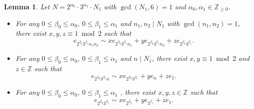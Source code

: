 \documentclass[12pt]{amsart}
\numberwithin{equation}{section}
\theoremstyle{plain}
\newtheorem{lemm}[thm]{Lemma}
\theoremstyle{definition}
\theoremstyle{remark}
\newcommand\numZ{\mathbb{Z}}
\newcommand\numgeq[2]{\mathbb{#1}_{\geq #2}}
\begin{document}
\begin{lemm}
\label{lemm:EquivZN}
Let $N=2^{\alpha_0}\cdot 3^{\alpha_1}\cdot N_1$ with $\gcd(N_1,6)=1$ and $\alpha_0,\alpha_1\in\numgeq{Z}{0}$.
\begin{itemize}
  \item For any $0\leq\beta_0\leq\alpha_0$, $0\leq\beta_1\leq\alpha_1$ and $n_1,n_2\mid N_1$ with $\gcd(n_1,n_2)=1$, there exist $x,y,z\equiv1\bmod 2$ such that
  \begin{equation}
  \label{eq:lemmEquivZN1}
  e_{2^{\beta_0}3^{\beta_1}n_1n_2}\sim xe_{2^{\beta_0}3^{\beta_1}n_1}+ye_{2^{\beta_0}3^{\beta_1}n_2}+ze_{2^{\beta_0}3^{\beta_1}}.
  \end{equation}
  \item For any $0\leq\beta_0\leq\alpha_0$, $0\leq\beta_1\leq\alpha_1$ and $n\mid N_1$, there exist $x,y\equiv1\bmod 2$ and $z\in\numZ$ such that
  \begin{equation}
  \label{eq:lemmEquivZN2}
  e_{2^{\beta_0}3^{\beta_1}n}\sim xe_{2^{\beta_0}3^{\beta_1}}+ye_{n}+ze_{1}.
  \end{equation}
  \item For any $0\leq\beta_0\leq\alpha_0$, $0\leq\beta_1\leq\alpha_1$ , there exist $x,y,z\in\numZ$ such that
  \begin{equation}
  \label{eq:lemmEquivZN3}
  e_{2^{\beta_0}3^{\beta_1}}\sim xe_{2^{\beta_0}}+ye_{3^{\beta_1}}+ze_{1}.
  \end{equation}
\end{itemize}
\end{lemm}
\end{document}
